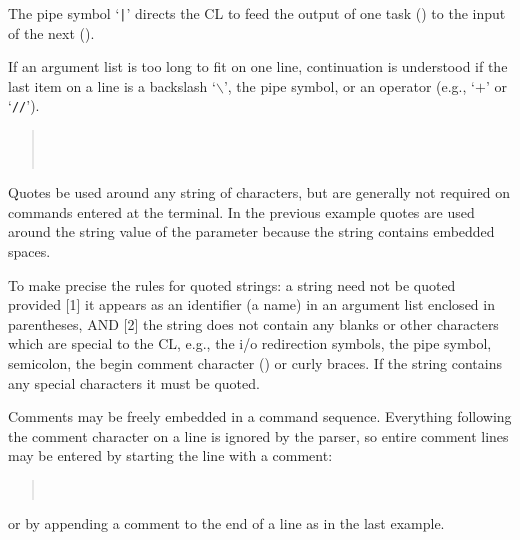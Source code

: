 \begin{quotation}\noindent
{} 
\end{quotation}

\noindent
The pipe symbol `{\tt |}' directs the CL to feed the output of
one task () to the input of the next ().

\noindent
If an argument list is too long to fit on one line,
continuation is understood if the last item on a line is a backslash
`$\backslash$', the pipe symbol, or an operator (e.g., `$+$' or `{\tt //}').

\begin{quotation}\noindent
{}  \\
\comptype{>>>}  \\
\comptype{>>>} 
\end{quotation}

Quotes  be used around
any string of characters, but are generally not required on commands
entered at the terminal.  In the previous example quotes are used
around the string value of the  parameter because the
string contains embedded spaces.

To make precise the rules for quoted strings:
a string need not be
quoted provided [1] it appears as an identifier (a name) in an argument
list  enclosed in parentheses, AND [2] the string does not
contain any blanks or other characters which are special to the CL,
e.g., the i/o redirection symbols, the pipe symbol, semicolon, the begin
comment character (\usertype{\#}) or curly braces.
If the string contains any special characters it must be quoted.

Comments may be freely embedded in a command sequence.
Everything following the comment character on a line is ignored by the parser,
so entire comment lines may be entered by starting the line with a comment:

\begin{quotation}\noindent
{}  \\
 
\end{quotation}

\noindent
or by appending a comment to the end of a line as in the last example.

